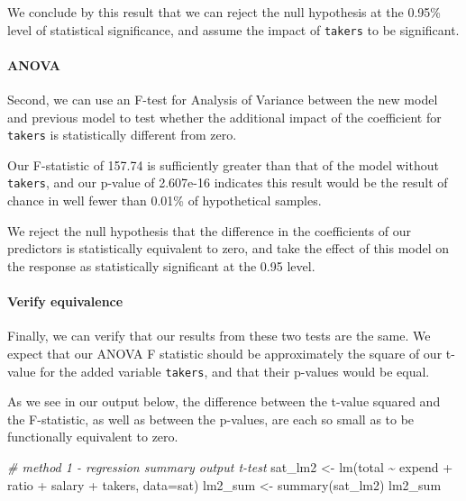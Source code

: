 \documentclass[
]{article}
\newenvironment{Shaded}{\begin{snugshade}}{\end{snugshade}}
\newcommand{\AttributeTok}[1]{\textcolor[rgb]{0.77,0.63,0.00}{#1}}
\newcommand{\CommentTok}[1]{\textcolor[rgb]{0.56,0.35,0.01}{\textit{#1}}}
\newcommand{\FunctionTok}[1]{\textcolor[rgb]{0.00,0.00,0.00}{#1}}
\newcommand{\NormalTok}[1]{#1}
\newcommand{\OtherTok}[1]{\textcolor[rgb]{0.56,0.35,0.01}{#1}}
\newcommand{\SpecialCharTok}[1]{\textcolor[rgb]{0.00,0.00,0.00}{#1}}
\begin{document}
We conclude by this result that we can reject the null hypothesis at the
0.95\% level of statistical significance, and assume the impact of
\texttt{takers} to be significant.

\hypertarget{anova-1}{%
\paragraph{ANOVA}\label{anova-1}}

Second, we can use an F-test for Analysis of Variance between the new
model and previous model to test whether the additional impact of the
coefficient for \texttt{takers} is statistically different from zero.

Our F-statistic of 157.74 is sufficiently greater than that of the model
without \texttt{takers}, and our p-value of 2.607e-16 indicates this
result would be the result of chance in well fewer than 0.01\% of
hypothetical samples.

We reject the null hypothesis that the difference in the coefficients of
our predictors is statistically equivalent to zero, and take the effect
of this model on the response as statistically significant at the 0.95
level.

\hypertarget{verify-equivalence}{%
\paragraph{Verify equivalence}\label{verify-equivalence}}

Finally, we can verify that our results from these two tests are the
same. We expect that our ANOVA F statistic should be approximately the
square of our t-value for the added variable \texttt{takers}, and that
their p-values would be equal.

As we see in our output below, the difference between the t-value
squared and the F-statistic, as well as between the p-values, are each
so small as to be functionally equivalent to zero.

\begin{Shaded}
\begin{Highlighting}[]
\CommentTok{\# method 1 {-} regression summary output t{-}test}
\NormalTok{sat\_lm2 }\OtherTok{\textless{}{-}} \FunctionTok{lm}\NormalTok{(total }\SpecialCharTok{\textasciitilde{}}\NormalTok{ expend }\SpecialCharTok{+}\NormalTok{ ratio }\SpecialCharTok{+}\NormalTok{ salary }\SpecialCharTok{+}\NormalTok{ takers, }\AttributeTok{data=}\NormalTok{sat)}
\NormalTok{lm2\_sum }\OtherTok{\textless{}{-}} \FunctionTok{summary}\NormalTok{(sat\_lm2)}
\NormalTok{lm2\_sum}
\end{Highlighting}
\end{Shaded}
\end{document}
